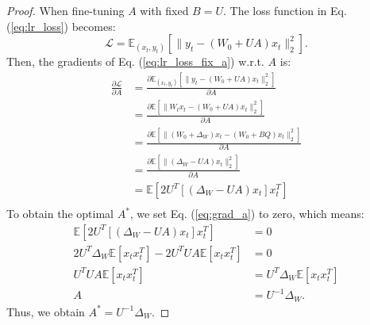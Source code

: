\begin{proof}
When fine-tuning $A$ with fixed $B = U$. The loss function in Eq. (\ref{eq:lr_loss}) becomes:
    \begin{equation} \label{eq:lr_loss_fix_b}
        \mathcal{L} = \mathbb{E}_{(x_{t}, y_{t})}[\|y_{t} - (W_0 + UA) x_{t} \|_2^2].
    \end{equation}
Then, the gradients of Eq. (\ref{eq:lr_loss_fix_a}) w.r.t. $A$ is:
\begin{equation} \label{eq:grad_a}
\begin{aligned}
    \frac{\partial \mathcal{L}}{\partial A} &=  \frac{\partial \mathbb{E}_{(x_{t}, y_{t})}[\|y_{t} - (W_0 + UA) x_{t} \|_2^2]}{\partial A} \\
    &= \frac{\partial \mathbb{E}[\|W_tx_t - (W_0 + UA) x_{t} \|_2^2]}{\partial A} \\
    &= \frac{\partial \mathbb{E}[\|(W_0 + \Delta_W)x_t - (W_0 + BQ) x_{t} \|_2^2]}{\partial A} \\
    &= \frac{\partial \mathbb{E}[\|(\Delta_W - UA)x_t \|_2^2]}{\partial A} \\
    &= \mathbb{E}[2U^T[(\Delta_W - UA)x_t]x_t^T] \\
\end{aligned}
\end{equation}
To obtain the optimal $A^*$, we set Eq. (\ref{eq:grad_a}) to zero, which means:
\begin{equation}
\begin{aligned}
    \mathbb{E}[2U^T[(\Delta_W - UA)x_t]x_t^T] &= 0 \\
    2U^T\Delta_W \mathbb{E}[x_tx_t^T] - 2U^TUA \mathbb{E}[x_tx_t^T] &= 0\\
    U^TUA \mathbb{E}[x_tx_t^T] &= U^T\Delta_W \mathbb{E}[x_tx_t^T] \\
    A &= U^{-1}\Delta_W.
\end{aligned}
\end{equation}
Thus, we obtain $A^*= U^{-1}\Delta_W$.
\end{proof}

